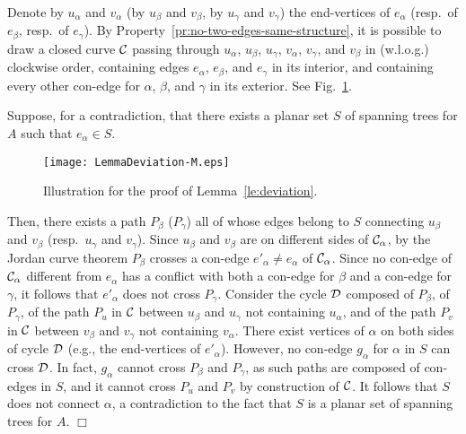 \documentclass[letter,runningheads]{llncs}
\renewenvironment{proof}
{{\em Proof.\ }}{\hspace*{\fill}$\Box$\par\vspace{2mm}}
\begin{document}
\begin{proof}
Denote by $u_{\alpha}$ and $v_{\alpha}$ (by $u_{\beta}$ and $v_{\beta}$, by $u_{\gamma}$ and $v_{\gamma}$) the end-vertices of $e_{\alpha}$ (resp.\ of $e_{\beta}$, resp.\ of $e_{\gamma}$). By Property~\ref{pr:no-two-edges-same-structure}, it is possible to draw a closed curve $\cal C$ passing through $u_{\alpha}$, $u_{\beta}$, $u_{\gamma}$, $v_{\alpha}$, $v_{\gamma}$, and $v_{\beta}$ in (w.l.o.g.) clockwise order, containing edges $e_{\alpha}$, $e_{\beta}$, and $e_{\gamma}$ in its interior, and containing every other con-edge for $\alpha$, $\beta$, and $\gamma$ in its exterior. See Fig.~\ref{fig:lemma-deviation}.

Suppose, for a contradiction, that there exists a planar set $S$ of spanning trees for $A$ such that $e_{\alpha}\in S$.
\begin{figure}[tb]
\begin{center}
\mbox{\texttt{[image: LemmaDeviation-M.eps]}}
\caption{Illustration for the proof of Lemma~\ref{le:deviation}.}
\label{fig:lemma-deviation}
\end{center}
\end{figure}
Then, there exists a path $P_{\beta}$ ($P_{\gamma}$) all of whose edges belong to $S$ connecting $u_{\beta}$ and $v_{\beta}$ (resp.\ $u_{\gamma}$ and $v_{\gamma}$). Since $u_{\beta}$ and $v_{\beta}$ are on different sides of ${\cal C}_{\alpha}$, by the Jordan curve theorem $P_{\beta}$ crosses a con-edge $e'_{\alpha}\neq e_{\alpha}$ of ${\cal C}_{\alpha}$. Since no con-edge of ${\cal C}_{\alpha}$ different from $e_{\alpha}$ has a conflict with both a con-edge for $\beta$ and a con-edge for $\gamma$, it follows that $e'_{\alpha}$ does not cross $P_{\gamma}$. Consider the cycle ${\cal D}$ composed of $P_{\beta}$, of $P_{\gamma}$, of the path $P_u$ in $\cal C$ between $u_{\beta}$ and $u_{\gamma}$ not containing $u_{\alpha}$, and of the path $P_v$ in $\cal C$ between $v_{\beta}$ and $v_{\gamma}$ not containing $v_{\alpha}$. There exist vertices of $\alpha$ on both sides of cycle ${\cal D}$ (e.g., the end-vertices of $e'_{\alpha}$). However, no con-edge $g_{\alpha}$ for $\alpha$ in $S$ can cross ${\cal D}$. In fact, $g_{\alpha}$ cannot cross $P_{\beta}$ and $P_{\gamma}$, as such paths are composed of con-edges in $S$, and it cannot cross $P_u$ and $P_v$ by construction of $\cal C$. It follows that $S$ does not connect $\alpha$, a contradiction to the fact that $S$ is a planar set of spanning trees for $A$.
\end{proof}
\end{document}
